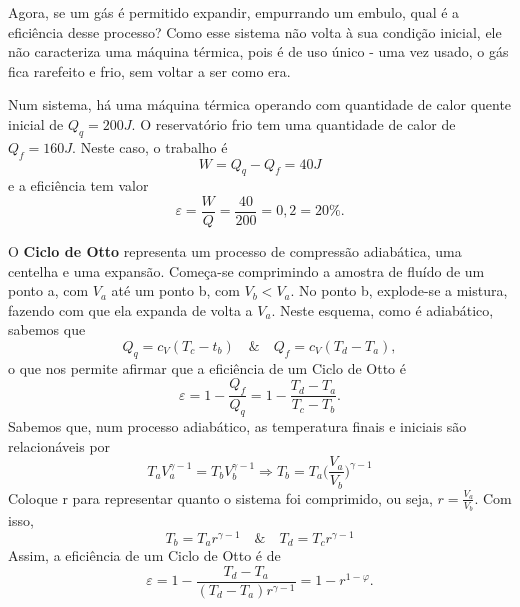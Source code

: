 \documentclass[phsyicsII_notes.tex]{subfiles}
\begin{document}
Agora, se um gás é permitido expandir, empurrando um embulo, qual é a eficiência desse processo? Como esse sistema não volta à sua condição
inicial, ele não caracteriza uma máquina térmica, pois é de uso único - uma vez usado, o gás fica rarefeito e frio, sem voltar a ser como era.
\begin{example}
	Num sistema, há uma máquina térmica operando com quantidade de calor quente inicial de \(Q_{q} = 200J\). O reservatório frio
	tem uma quantidade de calor de \(Q_{f} = 160J.\) Neste caso, o trabalho é
	\[
		W = Q_{q} - Q_{f} = 40J
	\]
	e a eficiência tem valor
	\[
		\varepsilon = \frac{W}{Q} = \frac{40}{200} = 0,2 = 20\%.
	\]
\end{example}
O \textbf{Ciclo de Otto} representa um processo de compressão adiabática, uma centelha e uma expansão. Começa-se comprimindo a amostra de fluído de um ponto a, com \(V_{a}\) até um ponto b, com \(V_{b} < V_{a}.\)
No ponto b, explode-se a mistura, fazendo com que ela expanda de volta a \(V_{a}.\) Neste esquema, como é adiabático, sabemos que
\[
	Q_{q} = c_{V}(T_{c}-t_{b})\quad\&\quad Q_{f} = c_{V}(T_{d}-T_{a}),
\]
o que nos permite afirmar que a eficiência de um Ciclo de Otto é
\[
	\varepsilon  = 1 - \frac{Q_{f}}{Q_{q}} = 1 - \frac{T_{d} - T_{a}}{T_{c} - T_{b}}.
\]
Sabemos que, num processo adiabático, as temperatura finais e iniciais são relacionáveis por
\[
	T_{a}V_{a}^{\gamma -1} = T_{b}V_{b}^{\gamma -1} \Rightarrow T_{b} = T_{a}\biggl(\frac{V_{a}}{V_{b}}\biggr)^{\gamma -1}
\]
Coloque r para representar quanto o sistema foi comprimido, ou seja, \(r = \frac{V_{a}}{V_{b}}\). Com isso,
\[
	T_{b} = T_{a}r^{\gamma -1}\quad\&\quad T_{d} = T_{c}r^{\gamma -1}
\]
Assim, a eficiência de um Ciclo de Otto é de
\[
	\varepsilon = 1 - \frac{T_{d}-T_{a}}{(T_{d}-T_{a})r^{\gamma -1}}= 1 - r^{1-\varphi }.
\]
\end{document}
